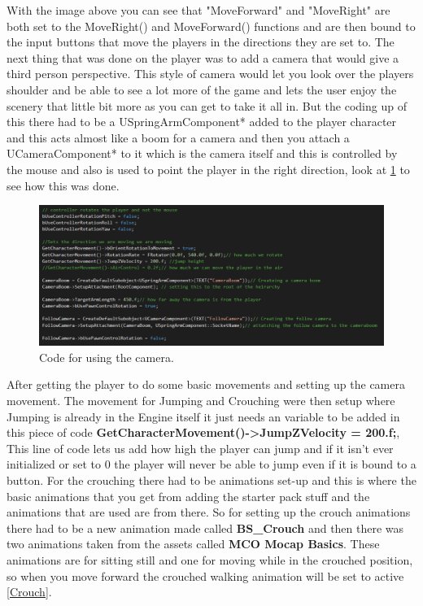 With the image above you can see that "MoveForward" and "MoveRight" are both set to the MoveRight() and MoveForward() functions and are then bound to the input buttons that move the players in the directions they are set to. 
\newline
\newline
The next thing that was done on the player was to add a camera that would give a third person perspective. This style of camera would let you look over the players shoulder and be able to see a lot more of the game and lets the user enjoy the scenery that little bit more as you can get to take it all in.
But the coding up of this there had to be a USpringArmComponent* added to the player character and this acts almost like a boom for a camera and then you attach a UCameraComponent* to it which is the camera itself and this is controlled by the mouse and also is used to point the player in the right direction, look at \ref{Camera} to see how this was done.
\begin{figure}[H]
    \centering
    \includegraphics[scale=.5]{img/CameraSetup.PNG}
    \caption{Code for using the camera.}
    \label{Camera}
\end{figure}
After getting the player to do some basic movements and setting up the camera movement. The movement for Jumping and Crouching were then setup where Jumping is already in the Engine itself it just needs an variable to be added in this piece of code \textbf{GetCharacterMovement()->JumpZVelocity = 200.f;}, This line of code lets us add how high the player can jump and if it isn't ever initialized or set to 0 the player will never be able to jump even if it is bound to a button. 
\newline
\newline
For the crouching there had to be animations set-up and this is where the basic animations that you get from adding the starter pack stuff and the animations that are used are from there. So for setting up the crouch animations there had to be a new animation made called \textbf{BS\_Crouch} and then there was two animations taken from the assets called \textbf{MCO Mocap Basics}. These animations are for sitting still and one for moving while in the crouched position, so when you move forward the crouched walking animation will be set to active \ref{Crouch}.
